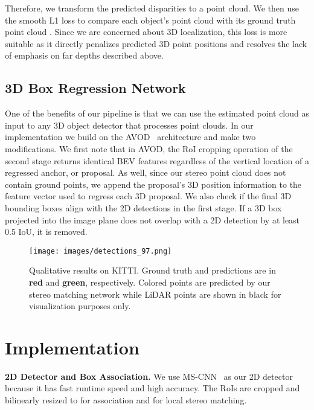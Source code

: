 \documentclass[letterpaper, 10 pt, conference]{ieeeconf}
\begin{document}
Therefore, we transform the predicted disparities to a point cloud. We then use the smooth L1 loss to compare each object's point cloud  with its ground truth point cloud . Since we are concerned about 3D localization, this loss is more suitable as it directly penalizes predicted 3D point positions and resolves the lack of emphasis on far depths described above.

\subsection{3D Box Regression Network}
One of the benefits of our pipeline is that we can use the estimated point cloud as input to any 3D object detector that processes point clouds. In our implementation we build on the AVOD~\cite{ku_avod} architecture and make two modifications. We first note that in AVOD, the RoI cropping operation of the second stage returns identical BEV features regardless of the vertical location of a regressed anchor, or proposal. As well, since our stereo point cloud does not contain ground points, we append the proposal's 3D position information to the feature vector used to regress each 3D proposal. We also check if the final 3D bounding boxes align with the 2D detections in the first stage. If a 3D box projected into the image plane does not overlap with a 2D detection by at least 0.5 IoU, it is removed.


\begin{figure}[t!]
	\begin{center}
		\texttt{[image: images/detections\_97.png]}
	\end{center}
	\caption{Qualitative results on KITTI. Ground truth and predictions are in \textbf{red} and \textbf{green}, respectively. Colored points are predicted by our stereo matching network while LiDAR points are shown in black for visualization purposes only.}
	\label{fig:detections}
\end{figure}

\section{Implementation}
\label{sec:implementation}

\textbf{2D Detector and Box Association.} We use MS-CNN~\cite{cai_mscnn} as our 2D detector because it has fast runtime speed and high accuracy. The RoIs are cropped and bilinearly resized to  for association and  for local stereo matching.
\end{document}
